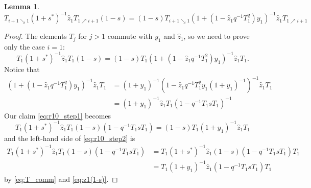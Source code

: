 \documentclass[reqno]{amsart}
\theoremstyle{plain}
\theoremstyle{definition}
\newtheorem{lemma}[theorem]{Lemma}
\theoremstyle{remark}
\newcommand{\z}{\widehat{z}}
\newcommand{\<}{\langle}
\renewcommand{\>}{\rangle}
\begin{document}
\begin{lemma}
    \label{lemma:proof_r10}
    \[ T_{i+1 \searrow 1} (1+s^*)^{-1} \z_1 T_{1 \nearrow i+1} (1-s) = (1-s) T_{i+1 \searrow 1} \left( 1 + \left( 1 - \z_1 q^{-1} T^2_1 \right) y_1 \right)^{-1} \z_1 T_{1 \nearrow i+1}\]
\end{lemma}

\begin{proof}
    The elements $T_j$ for $j>1$ commute with $y_1$ and $\z_1$, so we need to prove only the case $i=1$:
    \begin{equation}
        \label{eq:r10_step1}
        T_1(1+s^*)^{-1} \z_1 T_1 (1-s) = (1-s) T_1 \left( 1 + \left( 1 - \z_1 q^{-1} T^2_1 \right) y_1 \right)^{-1} \z_1 T_1.
    \end{equation}
    Notice that
    \begin{align*}
        \left( 1 + \left( 1 - \z_1 q^{-1} T^2_1 \right) y_1 \right)^{-1} \z_1 T_1 &= (1+y_1)^{-1} \left( 1 - \z_1 q^{-1} T^2_1  y_1 (1+y_1)^{-1} \right)^{-1} \z_1 T_1 \\
        & = (1+y_1)^{-1} \z_1 T_1 ( 1 - q^{-1} T_1 s T_1)^{-1} 
    \end{align*}
    Our claim \eqref{eq:r10_step1} becomes
    \begin{equation}
        \label{eq:r10_step2}
        T_1(1+s^*)^{-1} \z_1 T_1 (1-s) (1 - q^{-1} T_1 s T_1) = (1-s) T_1 (1+y_1)^{-1} \z_1 T_1
    \end{equation}
    and the left-hand side of \eqref{eq:r10_step2} is
    \begin{align*}
        T_1(1+s^*)^{-1} \z_1 T_1 (1-s) (1 - q^{-1} T_1 s T_1) &= T_1(1+s^*)^{-1} \z_1 (1-s) (1 - q^{-1} T_1 s T_1) T_1  \\
        &= T_1 (1 + y_1)^{-1} \z_1 ( 1 - q^{-1} T_1 s T_1) T_1 
    \end{align*}
    by \eqref{eq:T_comm} and \eqref{eq:z1(1-s)}.


\end{proof}
\end{document}
